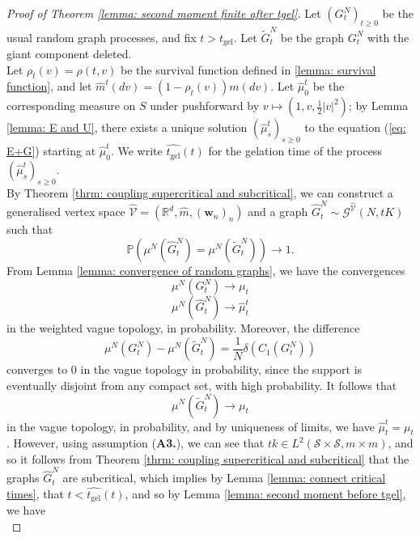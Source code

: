 \begin{proof}[Proof of Theorem \ref{lemma: second moment finite after tgel}] Let $(G^N_t)_{t\geq 0}$ be the usual random graph processes, and fix $t>t_\text{gel}$. Let $\widetilde{G}^N_{t}$ be the graph $G^N_{t}$ with the giant component deleted. \medskip \\ Let $\rho_{t}(v)=\rho(t, v)$ be the survival function defined in \ref{lemma: survival function}, and let $\widehat{m}^t(dv)=(1-\rho_{t}(v))m(dv)$. Let $\widehat{\mu}^t_0$ be the corresponding measure on $S$ under pushforward by $v\mapsto (1, v, \frac{1}{2}|v|^2)$; by Lemma \ref{lemma: E and U}, there exists a unique solution $(\widehat{\mu}^t_s)_{s\geq 0}$ to the equation (\ref{eq: E+G}) starting at $\widehat{\mu}^t_0$. We write $\widehat{t_\text{gel}}(t)$ for the gelation time of the process $(\widehat{\mu}^t_s)_{s\geq 0}$. \medskip \\ By Theorem \ref{thrm: coupling supercritical and subcritical}, we can construct a generalised vertex space $\widehat{\mathcal{V}}=(\mathbb{R}^d, \widehat{m}, (\mathbf{w}_n)_n)$ and a graph $\widehat{G}^N_{t}\sim \mathcal{G}^{\widehat{\mathcal{V}}}(N,tK)$ such that 
\begin{equation}
    \mathbb{P}\left(\mu^N(\widehat{G}^N_{t})=\mu^N(\widetilde{G}^N_{t})\right)\rightarrow 1.
\end{equation} From Lemma \ref{lemma: convergence of random graphs}, we have the convergences 
\begin{equation}
    \mu^N(G^N_{t})\rightarrow {\mu}_{t}
\end{equation}
\begin{equation}
    \mu^N(\widehat{G}^N_{t})\rightarrow \widehat{\mu}^t_{t}
\end{equation} in the weighted vague topology, in probability.  Moreover, the difference \begin{equation}
    \mu^N(G^N_{t})-\mu^N(\widetilde{G}^N_{t})=\frac{1}{N}\delta(C_1(G^N_{t}))
\end{equation} converges to $0$ in the vague topology in probability, since the support is eventually disjoint from any compact set, with high probability. It follows that \begin{equation}
    \mu^N(\widetilde{G}^N_{t})\rightarrow \mu_{t}
\end{equation} in the vague topology, in probability, and by uniqueness of limits, we have $\widehat{\mu}^t_{t}=\mu_{t}$. However, using assumption (\textbf{A3.}), we can see that $t k\in L^2(\mathcal{S}\times\mathcal{S}, m\times m)$, and so it follows from Theorem \ref{thrm: coupling supercritical and subcritical} that the graphs $\widehat{G}^N_{t}$ are subcritical, which implies by Lemma \ref{lemma: connect critical times}, that  $t<\widehat{t_\text{gel}}(t)$, and so by Lemma \ref{lemma: second moment before tgel}, we have \begin{equation}

\end{equation}
\end{proof}
